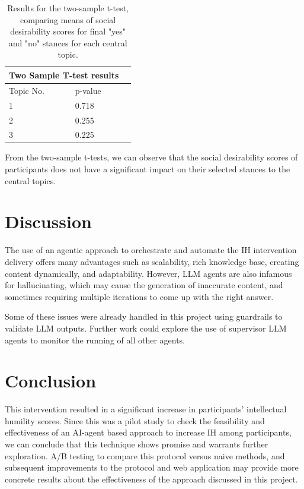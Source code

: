 \documentclass{scrartcl}
\begin{document}
\begin{table}[ht]
    \centering
    \begin{tabular}{llr}
\hline
\multicolumn{2}{c}{\textbf{Two Sample T-test results}} \\
\hline
Topic No.    & p-value \\
\hline
1   &   0.718   \\
2   &   0.255   \\
3   &   0.225   \\
\hline
\end{tabular}
    \caption{Results for the two-sample t-test, comparing means of social desirability scores for final "yes" and "no" stances for each central topic.}
    \label{tab:twosample-ttest-post-results}
\end{table}

From the two-sample t-tests, we can observe that the social desirability scores of participants does not have a significant impact on their selected stances to the central topics.


\section{Discussion}
The use of an agentic approach to orchestrate and automate the IH intervention delivery offers many advantages such as scalability, rich knowledge base, creating content dynamically, and adaptability. However, LLM agents are also infamous for hallucinating, which may cause the generation of inaccurate content, and sometimes requiring multiple iterations to come up with the right answer.

Some of these issues were already handled in this project using guardrails to validate LLM outputs. Further work could explore the use of supervisor LLM agents to monitor the running of all other agents. 


\section{Conclusion}

This intervention resulted in a significant increase in participants' intellectual humility scores. Since this was a pilot study to check the feasibility and effectiveness of an AI-agent based approach to increase IH among participants, we can conclude that this technique shows promise and warrants further exploration. A/B testing to compare this protocol versus naive methods, and subsequent improvements to the protocol and web application may provide more concrete results about the effectiveness of the approach discussed in this project.
\end{document}
